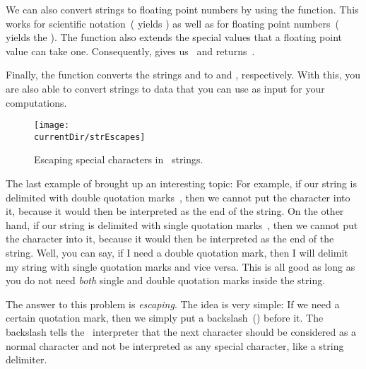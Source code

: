 We can also convert strings to floating point numbers by using the  function.
This works for scientific notation~( yields ) as well as for  floating point numbers~( yields the  ).
The  function also extends the special values that a floating point value can take one.
Consequently,  gives us~ and  returns~.

Finally, the function  converts the strings  and  to  and , respectively.
With this, you are also able to convert strings to data that you can use as input for your computations.%
%
\endhsection%
%
%
%
%
%
%
\begin{figure}%
\centering%
\texttt{[image: \\currentDir/strEscapes]}%
\caption{Escaping special characters in \python\ strings.}%
\label{fig:strEscapes}%
\end{figure}%
%
The last example of  brought up an interesting topic:
For example, if our string is delimited with double quotation marks~\pythonIdx{\textquotedbl}, then we cannot put the character  into it, because it would then be interpreted as the end of the string.
On the other hand, if our string is delimited with single quotation marks~\pythonIdx{\textquotesingle}, then we cannot put the character  into it, because it would then be interpreted as the end of the string.
Well, you can say, if I need a double quotation mark, then I will delimit my string with single quotation marks and vice versa.
This is all good as long as you do not need \emph{both} single and double quotation marks inside the string.

The answer to this problem is \emph{escaping}.
The idea is very simple:
If we need a certain quotation mark, then we simply put a backslash~(\inQuotes{\textbackslash})\pythonIdx{\textbackslash} before it.
The backslash tells the \python\ interpreter that the next character should be considered as a normal character and not be interpreted as any special character, like a string delimiter.

